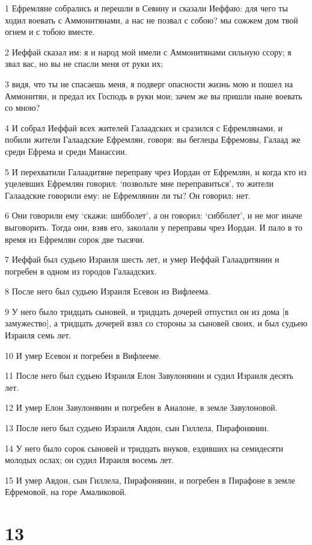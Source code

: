 \par 1 Ефремляне собрались и перешли в Севину и сказали Иеффаю: для чего ты ходил воевать с Аммонитянами, а нас не позвал с собою? мы сожжем дом твой огнем и с тобою вместе.
\par 2 Иеффай сказал им: я и народ мой имели с Аммонитянами сильную ссору; я звал вас, но вы не спасли меня от руки их;
\par 3 видя, что ты не спасаешь меня, я подверг опасности жизнь мою и пошел на Аммонитян, и предал их Господь в руки мои; зачем же вы пришли ныне воевать со мною?
\par 4 И собрал Иеффай всех жителей Галаадских и сразился с Ефремлянами, и побили жители Галаадские Ефремлян, говоря: вы беглецы Ефремовы, Галаад же среди Ефрема и среди Манассии.
\par 5 И перехватили Галаадитяне переправу чрез Иордан от Ефремлян, и когда кто из уцелевших Ефремлян говорил: `позвольте мне переправиться', то жители Галаадские говорили ему: не Ефремлянин ли ты? Он говорил: нет.
\par 6 Они говорили ему `скажи: шибболет', а он говорил: `сибболет', и не мог иначе выговорить. Тогда они, взяв его, заколали у переправы чрез Иордан. И пало в то время из Ефремлян сорок две тысячи.
\par 7 Иеффай был судьею Израиля шесть лет, и умер Иеффай Галаадитянин и погребен в одном из городов Галаадских.
\par 8 После него был судьею Израиля Есевон из Вифлеема.
\par 9 У него было тридцать сыновей, и тридцать дочерей отпустил он из дома [в замужество], а тридцать дочерей взял со стороны за сыновей своих, и был судьею Израиля семь лет.
\par 10 И умер Есевон и погребен в Вифлееме.
\par 11 После него был судьею Израиля Елон Завулонянин и судил Израиля десять лет.
\par 12 И умер Елон Завулонянин и погребен в Аиалоне, в земле Завулоновой.
\par 13 После него был судьею Израиля Авдон, сын Гиллела, Пирафонянин.
\par 14 У него было сорок сыновей и тридцать внуков, ездивших на семидесяти молодых ослах; он судил Израиля восемь лет.
\par 15 И умер Авдон, сын Гиллела, Пирафонянин, и погребен в Пирафоне в земле Ефремовой, на горе Амаликовой.

\chapter{13}

